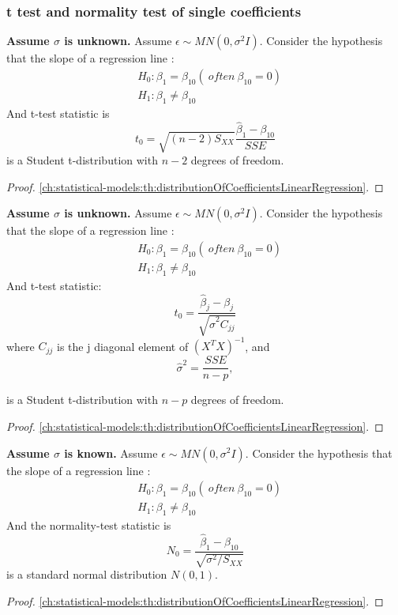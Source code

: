\begin{refsection}
\subsubsection{t test and normality test of single coefficients}



\begin{lemma}\cite[261]{chinese2008probability}
	\textbf{Assume $\sigma$ is unknown.}	Assume $\epsilon \sim MN(0,\sigma^2 I)$. Consider the hypothesis that the slope of a regression line :
	\begin{align*}
	&H_0: \beta_1 = \beta_{10} (~often ~ \beta_{10} = 0)\\
	&H_1: \beta_1 \neq \beta_{10}
	\end{align*}
	And t-test statistic is
	$$t_0 = \sqrt{(n-2)S_{XX}}\frac{\hat{\beta}_1 - \beta_{10}}{SSE}$$
	is a Student t-distribution with $n-2$ degrees of freedom. 
\end{lemma}
\begin{proof}
	\autoref{ch:statistical-models:th:distributionOfCoefficientsLinearRegression}.
\end{proof}

\begin{lemma}\cite[261]{chinese2008probability}
	\textbf{Assume $\sigma$ is unknown.}	Assume $\epsilon \sim MN(0,\sigma^2 I)$. Consider the hypothesis that the slope of a regression line :
	\begin{align*}
	&H_0: \beta_1 = \beta_{10} (~often ~ \beta_{10} = 0)\\
	&H_1: \beta_1 \neq \beta_{10}
	\end{align*}
	And t-test statistic:
	$$t_0 = \frac{\hat{\beta}_j - \beta_j}{\sqrt{\hat{\sigma}^2C_{jj}}} $$
	where $C_{jj}$ is the j diagonal element of $(X^TX)^{-1}$, and $$\hat{\sigma}^2 = \frac{SSE}{n-p},$$
	
	is a Student t-distribution with $n-p$ degrees of freedom. 
\end{lemma}
\begin{proof}
	\autoref{ch:statistical-models:th:distributionOfCoefficientsLinearRegression}.
\end{proof}

\begin{lemma}\cite[261]{chinese2008probability}
	\textbf{Assume $\sigma$ is known.}	Assume $\epsilon \sim MN(0,\sigma^2 I)$. Consider the hypothesis that the slope of a regression line :
	\begin{align*}
	&H_0: \beta_1 = \beta_{10} (~often ~ \beta_{10} = 0)\\
	&H_1: \beta_1 \neq \beta_{10}
	\end{align*}
	And the normality-test statistic is
	$$N_0 = \frac{\hat{\beta}_1 - \beta_{10}}{\sqrt{\sigma^2/S_{XX}}}$$
	is a standard normal distribution $N(0,1)$. 
\end{lemma}
\begin{proof}
	\autoref{ch:statistical-models:th:distributionOfCoefficientsLinearRegression}.
\end{proof}


\end{refsection}
